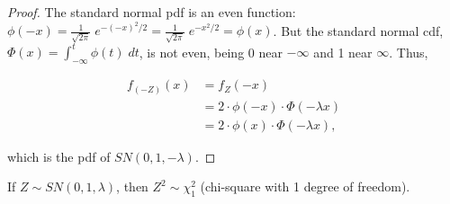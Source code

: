 \documentclass{article}
\begin{document}
\begin{proof}
  The standard normal pdf is an even function: $\phi(-x) =
  \frac{1}{\sqrt{2\pi}}\;e^{-(-x)^2/2} = \frac{1}{\sqrt{2\pi}}\;e^{-x^2/2} =
  \phi(x)$. But the standard normal cdf, \thinspace $\Phi(x) = \int_{-\infty}^t
  \phi(t)\;dt$, \thinspace is not even, being 0 near $-\infty$ and 1 near
  $\infty$. Thus,
  
  \begin{align*}
    f_{(-Z)}(x) &= f_Z(-x) \\
    & = 2 \cdot \phi(-x) \cdot \Phi (-\lambda x) \\
    & = 2 \cdot \phi(x) \cdot \Phi (-\lambda x),
  \end{align*}

  which is the pdf of $SN(0, 1, -\lambda)$.
\end{proof}

\begin{property} \label{prop:2}
  If $Z \sim SN(0, 1, \lambda)$, then $Z^2 \sim \chi^2_1$ (chi-square with 1 degree of freedom).
\end{property}
\end{document}
